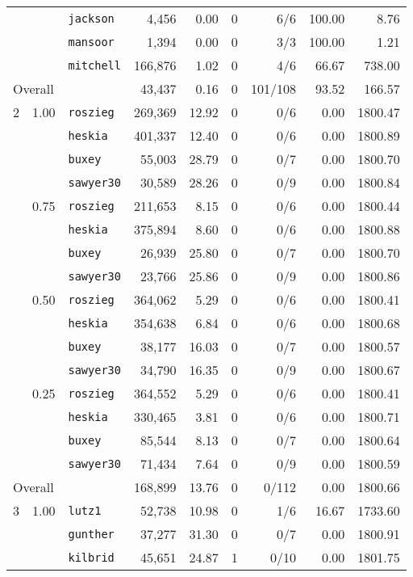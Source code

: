 \begin{table}[tpb]
\begin{tabular}{cclrrrrrr}
		&		& {\tt jackson}	& 4,456 & 0.00 & 0 & 6/6 & 100.00 & 8.76 \\
		&		& {\tt mansoor}	& 1,394 & 0.00 & 0 & 3/3 & 100.00 & 1.21 \\
		&		& {\tt mitchell}	& 166,876 & 1.02 & 0 & 4/6 & 66.67 & 738.00 \\[1mm]
		\multicolumn{2}{l}{Overall} & & 43,437 & 0.16 & 0 & 101/108 & 93.52 & 166.57 \\\midrule
		2 & 1.00 & {\tt roszieg}	& 269,369 & 12.92 & 0 & 0/6 & 0.00 & 1800.47 \\
		&		& {\tt heskia}	& 401,337 & 12.40 & 0 & 0/6 & 0.00 & 1800.89 \\
		&		& {\tt buxey}	& 55,003 & 28.79 & 0 & 0/7 & 0.00 & 1800.70 \\
		&		& {\tt sawyer30}	& 30,589 & 28.26 & 0 & 0/9 & 0.00 & 1800.84 \\
		& 0.75	& {\tt roszieg}	& 211,653 & 8.15 & 0 & 0/6 & 0.00 & 1800.44 \\
		&		& {\tt heskia}	& 375,894 & 8.60 & 0 & 0/6 & 0.00 & 1800.88 \\
		&		& {\tt buxey}	& 26,939 & 25.80 & 0 & 0/7 & 0.00 & 1800.70 \\
		&		& {\tt sawyer30}	& 23,766 & 25.86 & 0 & 0/9 & 0.00 & 1800.86 \\
		& 0.50	& {\tt roszieg}	& 364,062 & 5.29 & 0 & 0/6 & 0.00 & 1800.41 \\
		&		& {\tt heskia}	& 354,638 & 6.84 & 0 & 0/6 & 0.00 & 1800.68 \\
		&		& {\tt buxey}	& 38,177 & 16.03 & 0 & 0/7 & 0.00 & 1800.57 \\
		&		& {\tt sawyer30}	& 34,790 & 16.35 & 0 & 0/9 & 0.00 & 1800.67 \\
		& 0.25	& {\tt roszieg}	& 364,552 & 5.29 & 0 & 0/6 & 0.00 & 1800.41 \\
		&		& {\tt heskia}	& 330,465 & 3.81 & 0 & 0/6 & 0.00 & 1800.71 \\
		&		& {\tt buxey}	& 85,544 & 8.13 & 0 & 0/7 & 0.00 & 1800.64 \\
		&		& {\tt sawyer30}	& 71,434 & 7.64 & 0 & 0/9 & 0.00 & 1800.59 \\[1mm]
		\multicolumn{2}{l}{Overall} & & 168,899 & 13.76 & 0 & 0/112 & 0.00 & 1800.66 \\\midrule
		3 & 1.00 & {\tt lutz1}	& 52,738 & 10.98 & 0 & 1/6 & 16.67 & 1733.60 \\
		&		& {\tt gunther}	& 37,277 & 31.30 & 0 & 0/7 & 0.00 & 1800.91 \\
		&		& {\tt kilbrid}	& 45,651 & 24.87 & 1 & 0/10 & 0.00 & 1801.75 \\

\end{tabular}
\end{table}
